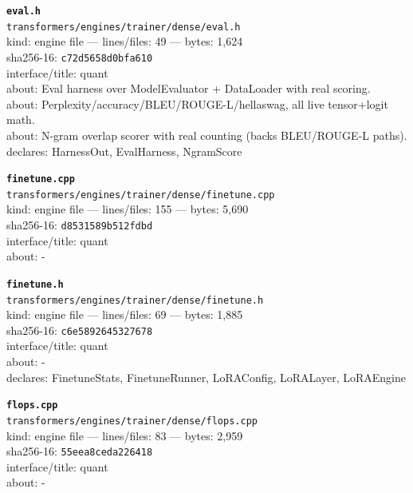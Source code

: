 \noindent\textbf{\texttt{eval.h}}\\
\texttt{transformers/engines/trainer/dense/eval.h}\\
kind: engine file --- lines/files: 49 --- bytes: 1,624\\
sha256-16: \texttt{c72d5658d0bfa610}\\
interface/title: quant\\
about: Eval harness over ModelEvaluator + DataLoader with real scoring.\\
about: Perplexity/accuracy/BLEU/ROUGE-L/hellaswag, all live tensor+logit math.\\
about: N-gram overlap scorer with real counting (backs BLEU/ROUGE-L paths).\\
declares: HarnessOut, EvalHarness, NgramScore\\
\vspace*{6.0pt}
\newpage

\noindent\textbf{\texttt{finetune.cpp}}\\
\texttt{transformers/engines/trainer/dense/finetune.cpp}\\
kind: engine file --- lines/files: 155 --- bytes: 5,690\\
sha256-16: \texttt{d8531589b512fdbd}\\
interface/title: quant\\
about: -\\
\vspace*{6.0pt}

\noindent\textbf{\texttt{finetune.h}}\\
\texttt{transformers/engines/trainer/dense/finetune.h}\\
kind: engine file --- lines/files: 69 --- bytes: 1,885\\
sha256-16: \texttt{c6e5892645327678}\\
interface/title: quant\\
about: -\\
declares: FinetuneStats, FinetuneRunner, LoRAConfig, LoRALayer, LoRAEngine\\
\vspace*{6.0pt}

\noindent\textbf{\texttt{flops.cpp}}\\
\texttt{transformers/engines/trainer/dense/flops.cpp}\\
kind: engine file --- lines/files: 83 --- bytes: 2,959\\
sha256-16: \texttt{55eea8ceda226418}\\
interface/title: quant\\
about: -\\
\vspace*{6.0pt}

